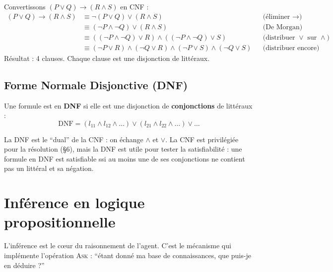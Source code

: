 \documentclass[11pt,a4paper]{article}
\newcommand{\cmark}{\ding{51}}
\begin{document}
\begin{exemplebox}
Convertissons $(P \lor Q) \rightarrow (R \land S)$ en CNF :
\begin{align*}
(P \lor Q) \rightarrow (R \land S) &\equiv \neg(P \lor Q) \lor (R \land S) && \text{(éliminer } \rightarrow \text{)} \\
&\equiv (\neg P \land \neg Q) \lor (R \land S) && \text{(De Morgan)} \\
&\equiv ((\neg P \land \neg Q) \lor R) \land ((\neg P \land \neg Q) \lor S) && \text{(distribuer } \lor \text{ sur } \land \text{)} \\
&\equiv (\neg P \lor R) \land (\neg Q \lor R) \land (\neg P \lor S) \land (\neg Q \lor S) && \text{(distribuer encore)}
\end{align*}
Résultat : 4 clauses. Chaque clause est une disjonction de littéraux. \cmark
\end{exemplebox}

\subsection{Forme Normale Disjonctive (DNF)}

\begin{definitionbox}
Une formule est en \textbf{DNF} si elle est une disjonction de \textbf{conjonctions} de littéraux :
$$\text{DNF} = (l_{11} \land l_{12} \land \ldots) \lor (l_{21} \land l_{22} \land \ldots) \lor \ldots$$
\end{definitionbox}

La DNF est le ``dual'' de la CNF : on échange $\land$ et $\lor$. La CNF est privilégiée pour la résolution (§6), mais la DNF est utile pour tester la satisfiabilité : une formule en DNF est satisfiable ssi au moins une de ses conjonctions ne contient pas un littéral et sa négation.

\section{Inférence en logique propositionnelle}

L'inférence est le cœur du raisonnement de l'agent. C'est le mécanisme qui implémente l'opération \textsc{Ask} : ``étant donné ma base de connaissances, que puis-je en déduire ?''
\end{document}
